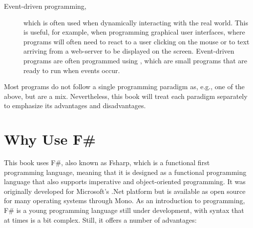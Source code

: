\begin{description}
\item[Event-driven programming,] which is often used when dynamically interacting with the real world. This is useful, for example, when programming graphical user interfaces, where programs will often need to react to a user clicking on the mouse or to text arriving from a web-server to be displayed on the screen. Event-driven programs are often programmed using , which are small programs that are ready to run when events occur.
\end{description}
Most programs do not follow a single programming paradigm as, e.g., one of the above, but are a mix. Nevertheless, this book will treat each paradigm separately to emphasize its advantages and disadvantages.

\section{Why Use F\#}
This book uses F\#, also known as Fsharp, which is a functional first programming language, meaning that it is designed as a functional programming language that also supports imperative and object-oriented programming. It was originally developed for Microsoft's .Net platform but is available as open source for many operating systems through Mono. As an introduction to programming, F\# is a young programming language still under development, with syntax that at times is a bit complex. Still, it offers a number of advantages:
